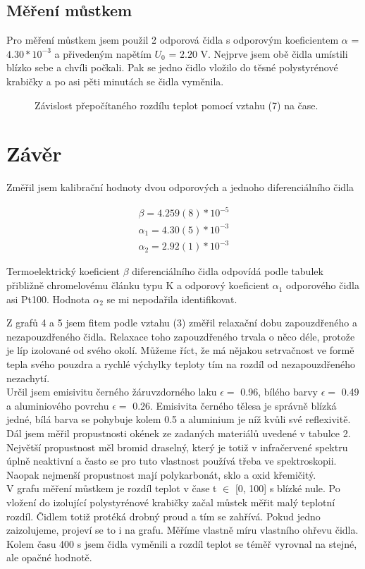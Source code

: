 \documentclass[a4paper,11pt]{article}
\begin{document}
\subsection{Měření můstkem}

Pro měření můstkem jsem použil 2 odporová čidla s odporovým koeficientem $\alpha$ = $4.30 * 10 ^ {-3}$ 
a přivedeným napětím  $U_0$ = $2.20$ V. Nejprve jsem obě čidla umístili blízko sebe a chvíli počkali. Pak se jedno čidlo vložilo do těsné polystyrénové krabičky a po asi pěti minutách se čidla vyměnila.

\begin{figure}[ht]
  \centering
  
  \caption{ Závislost přepočítaného rozdílu teplot pomocí vztahu (7) na čase.}
\end{figure}

\section{Závěr}

Změřil jsem kalibrační hodnoty dvou odporových a jednoho diferenciálního čidla 

\begin{align}
  \beta = 4.259(8) * 10^{-5} \\
  \alpha_1 = 4.30(5) * 10^{-3} \\
  \alpha_2 = 2.92(1) * 10^{-3}\end{align}

\noindent
Termoelektrický koeficient $\beta$ diferenciálního čidla odpovídá podle tabulek přibližně chromelovému článku typu K a odporový koeficient $\alpha_1$ odporového čidla asi Pt100. Hodnota $\alpha_2$ se mi nepodařila identifikovat.

Z grafů 4 a 5 jsem fitem podle vztahu (3) změřil relaxační dobu zapouzdřeného a nezapouzdřeného čidla. Relaxace toho zapouzdřeného trvala o něco déle, protože je líp izolované od svého okolí. Můžeme říct, že má nějakou setrvačnost ve formě tepla svého pouzdra a rychlé výchylky teploty tím na rozdíl od nezapouzdřeného nezachytí. \\

Určil jsem emisivitu černého žáruvzdorného laku $\epsilon =$ 0.96, bílého barvy $\epsilon =$ 0.49 a aluminiového povrchu $\epsilon =$ 0.26. Emisivita černého tělesa je správně blízká jedné, bílá barva se pohybuje kolem 0.5 a aluminium je níž kvůli své reflexivitě. Dál jsem měřil propustnosti okének ze zadaných materiálů uvedené v tabulce 2. Největší propustnost měl bromid draselný, který je totiž v infračervené spektru úplně neaktivní a často se pro tuto vlastnost používá třeba ve spektroskopii. Naopak nejmenší propustnost mají polykarbonát, sklo a oxid křemičitý. \\

V grafu měření můstkem je rozdíl teplot v čase t $\in$  [0,  100] s blízké nule.
Po vložení do izolující polystyrénové krabičky začal můstek měřit malý teplotní rozdíl.
Čidlem totiž protéká drobný proud a tím se zahřívá. Pokud jedno zaizolujeme, projeví se to i na grafu. 
Měříme vlastně míru vlastního ohřevu čidla. Kolem času 400 s jsem čidla vyměnili a rozdíl teplot se téměř vyrovnal 
na stejné, ale opačné hodnotě.

\newpage
\end{document}
